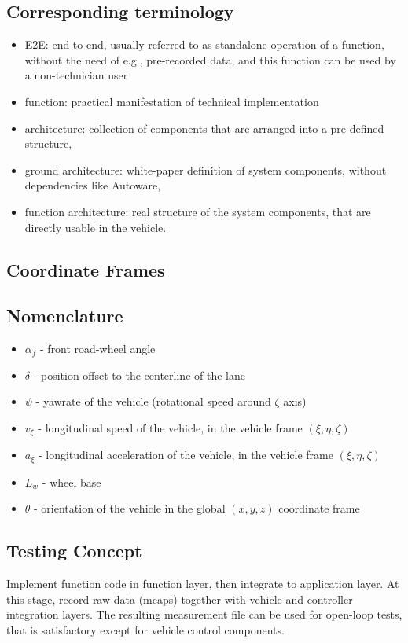\documentclass[sn-mathphys-num]{sn-jnl}%
\begin{document}
\subsection{Corresponding terminology}
\begin{itemize}
    \item E2E: end-to-end, usually referred to as standalone operation of a function, without the need of e.g., pre-recorded data, and this function can be used by a non-technician user
    \item function: practical manifestation of technical implementation
    \item architecture: collection of components that are arranged into a pre-defined structure,
    \item ground architecture: white-paper definition of system components, without dependencies like Autoware,
    \item function architecture: real structure of the system components, that are directly usable in the vehicle.
\end{itemize}

\subsection{Coordinate Frames}

\subsection{Nomenclature}
\begin{itemize}
    \item $\alpha_f$ - front road-wheel angle
    \item $\delta$ - position offset to the centerline of the lane
    \item $\psi$ - yawrate of the vehicle (rotational speed around $\zeta$ axis)
    \item $v_\xi$ - longitudinal speed of the vehicle, in the vehicle frame $(\xi,\eta,\zeta)$
    \item $a_\xi$ - longitudinal acceleration of the vehicle, in the vehicle frame $(\xi,\eta,\zeta)$
    \item $L_w$ - wheel base
    \item $\theta$ - orientation of the vehicle in the global $(x,y,z)$ coordinate frame
\end{itemize}

\subsection{Testing Concept}
Implement function code in function layer, then integrate to application layer. At this stage, record raw data (mcaps) together with vehicle and controller integration layers. The resulting measurement file can be used for open-loop tests, that is satisfactory except for vehicle control components.
\end{document}
